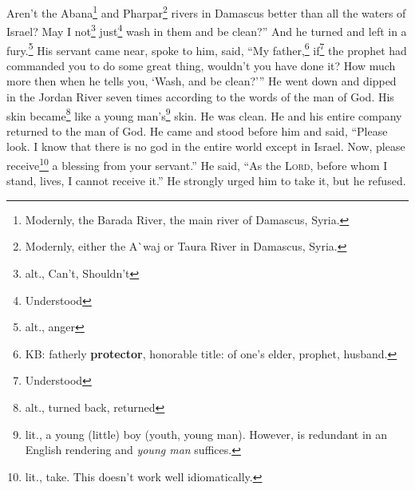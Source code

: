 \begin{inparaenum}
     Aren't the Abana\footnote{Modernly, the Barada River, the main river of Damascus, Syria.} and Pharpar\footnote{Modernly, either the A\`{}waj or Taura River in Damascus, Syria.} rivers in Damascus better than all the waters of Israel? May I not\footnote{alt., Can't, Shouldn't} just\footnote{Understood} wash in them and be clean?'' And he turned and left in a fury.\footnote{alt., anger}%
     His servant came near, spoke to him, said, ``My father,\footnote{KB: fatherly \textbf{protector}, honorable title: of one's elder, prophet, husband.} if\footnote{Understood} the prophet had commanded you to do some great thing, wouldn't you have done it? How much more then when he tells you, `Wash, and be clean?'\thinspace''%
     He went down and dipped in the Jordan River seven times according to the words of the man of God. His skin became\footnote{alt., turned back, returned} like a young man's\footnote{lit., a young (little) boy (youth, young man). However,  is redundant in an English rendering and \textit{young man} suffices.} skin. He was clean.%
     He and his entire company returned to the man of God. He came and stood before him and said, ``Please look. I know that there is no god in the entire world except in Israel. Now, please receive\footnote{lit., take. This doesn't work well idiomatically.} a blessing from your servant.''%
     He said, ``As the \textsc{Lord}, before whom I stand, lives, I cannot receive it.'' He strongly urged him to take it, but he refused.%
\end{inparaenum}
